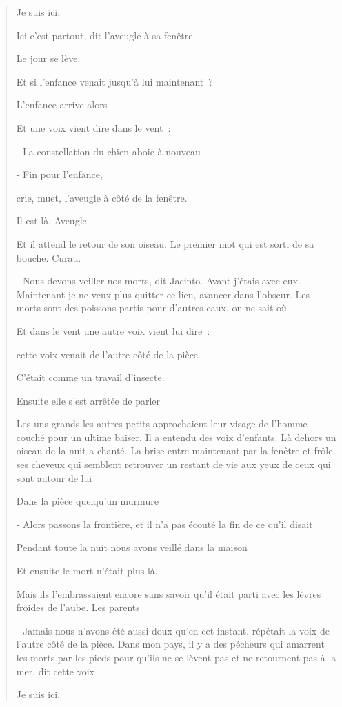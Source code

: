 \begin{quote}
Je suis ici.

Ici c'est partout, dit l'aveugle à sa fenêtre.

Le jour se lève.

Et si l'enfance venait jusqu'à lui maintenant~?

L'enfance arrive alors

Et une voix vient dire dans le vent~:

- La constellation du chien aboie à nouveau

- Fin pour l'enfance,

crie, muet, l'aveugle à côté de la fenêtre.

Il est là. Aveugle.

Et il attend le retour de son oiseau. Le premier mot qui est sorti de sa
bouche. Curau.

- Nous devons veiller nos morts, dit Jacinto. Avant j'étais avec eux.
Maintenant je ne veux plus quitter ce lieu, avancer dans l'obscur. Les
morts sont des poissons partis pour d'autres eaux, on ne sait où

Et dans le vent une autre voix vient lui dire~:

cette voix venait de l'autre côté de la pièce.

C'était comme un travail d'insecte.

Ensuite elle s'est arrêtée de parler

Les uns grands les autres petits approchaient leur visage de l'homme
couché pour un ultime baiser. Il a entendu des voix d'enfants. Là dehors
un oiseau de la nuit a chanté. La brise entre maintenant par la fenêtre
et frôle ses cheveux qui semblent retrouver un restant de vie aux yeux
de ceux qui sont autour de lui

Dans la pièce quelqu'un murmure

- Alors passons la frontière, et il n'a pas écouté la fin de ce qu'il
disait

Pendant toute la nuit nous avons veillé dans la maison

Et ensuite le mort n'était plus là.

Mais ils l'embrassaient encore sans savoir qu'il était parti avec les
lèvres froides de l'aube. Les parents

- Jamais nous n'avons été aussi doux qu'en cet instant, répétait la voix
de l'autre côté de la pièce. Dans mon pays, il y a des pécheurs qui
amarrent les morts par les pieds pour qu'ils ne se lèvent pas et ne
retournent pas à la mer, dit cette voix

Je suis ici.


\end{quote}
